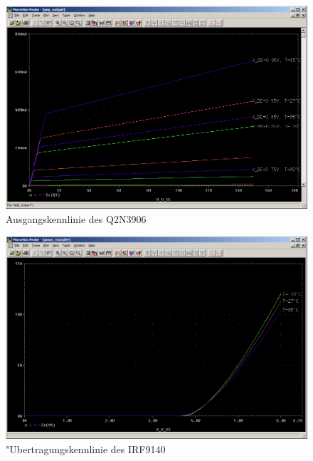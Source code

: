 \begin{figure}%
	\centering
	\includegraphics[width=\textwidth]{fig/ue2_ex3_pnp_output.PNG}
	\caption{Ausgangskennlinie des Q2N3906}
	\label{fig:3_pnp_output}
\end{figure}

\begin{figure}%
	\centering
	\includegraphics[width=\textwidth]{fig/ue2_ex3_pmos_transfer.PNG}
	\caption{"Ubertragungskennlinie des IRF9140}
	\label{fig:3_pmos_transfer}
\end{figure}

